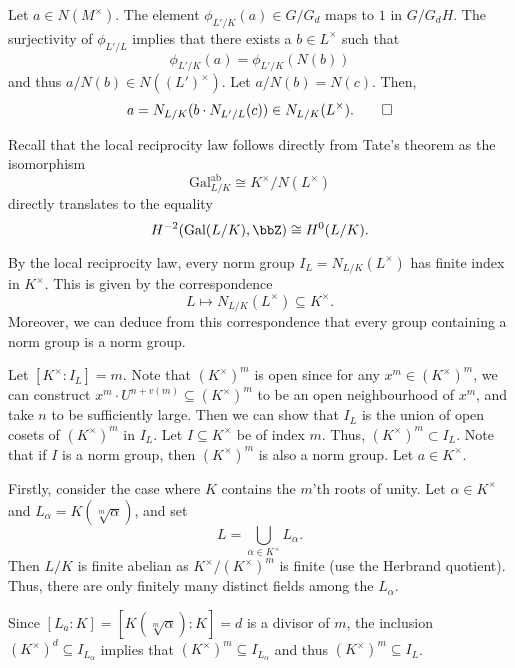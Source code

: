 \documentclass[a4paper, 12pt,oneside,openany]{book}
\begin{document}
Let $a \in N(M^\times)$. The element $\phi_{L'/K}(a) \in G/G_d$ maps to $1$ in $G/G_dH$. The surjectivity of $\phi_{L'/L}$ implies that there exists a $b \in L^\times$ such that $$\phi_{L'/K}(a) = \phi_{L'/K}(N(b))$$ and thus $a/N(b) \in N((L')^\times)$. Let $a/N(b) = N(c)$. Then, $$a = N_{L/K}(b \cdot N_{L'/L}(c)) \in N_{L/K}(L^\times). \qed$$


 Recall that the local reciprocity law follows directly from Tate's theorem as the isomorphism $$\text{Gal}_{L/K}^{\text{ab}} \cong K^\times / N(L^\times)$$ directly translates to the equality $$H^{-2}(\text{Gal}(L/K), \bbZ) \cong H^0(L/K).$$ 

By the local reciprocity law, every norm group $I_L=N_{L/K}(L^\times)$ has finite index in $K^\times$. This is given by the correspondence $$L \mapsto N_{L/K}(L^\times) \subseteq K^\times.$$ Moreover, we can deduce from this correspondence that every group containing a norm group is a norm group.

Let $[K^\times: I_L]=m$. Note that $(K^\times)^m$ is open since for any $x^m \in (K^\times)^m$, we can construct $x^m \cdot U^{n+v(m)} \subseteq (K^\times)^m$ to be an open neighbourhood of $x^m$, and take $n$ to be sufficiently large. Then we can show that $I_L$ is the union of open cosets of ${(K^\times)}^m$ in $I_L$. Let $I \subseteq K^\times$ be of index $m$. Thus, ${(K^\times)}^m \subset I_L$. Note that if $I$ is a norm group, then $(K^\times)^m$ is also a norm group. Let $a \in K^\times$. 

Firstly, consider the case where $K$ contains the $m$'th roots of unity. Let $\alpha \in K^\times$ and $L_\alpha = K(\sqrt[m]{\alpha})$, and set $$L = \bigcup\limits_{\alpha \in K^\times} L_\alpha.$$ Then $L/K$ is finite abelian as $K^\times/{(K^\times)}^m$ is finite (use the Herbrand quotient). Thus, there are only finitely many distinct fields among the $L_\alpha$. 

Since $[L_a:K] = [K(\sqrt[m]{\alpha}):K]=d$ is a divisor of $m$, the inclusion $(K^\times)^d \subseteq I_{L_\alpha}$ implies that $(K^\times)^m \subseteq I_{L_\alpha}$ and thus $(K^\times)^m \subseteq I_L$. 
\end{document}
